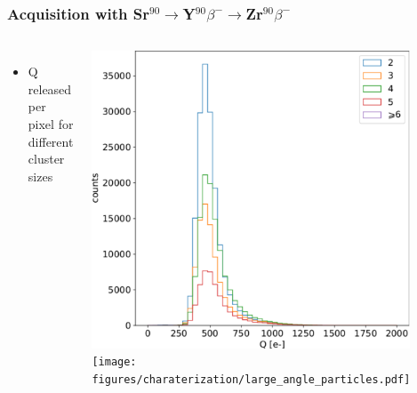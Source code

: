     \begin{frame}
        \frametitle{Acquisition with Sr$^{90}$$\rightarrow$Y$^{90}$$\beta^-$$\rightarrow$Zr$^{90}$$\beta^-$}
        \begin{columns}
                \begin{itemize}
                    \item Q released per pixel for different cluster sizes
                \end{itemize}
                \bigskip
                \includegraphics[width=1.1\linewidth]{figures/charaterization/Sr90_spectrum_per_pixel.pdf} 
            \centering\texttt{[image: figures/charaterization/large\_angle\_particles.pdf]}
                \begin{figure}
                    \includegraphics[width=.3\linewidth]{figures/charaterization/evts/Sr90/18b.png}

\end{figure}
\end{columns}
\end{frame}
